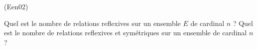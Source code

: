 \begin{tiny}(Een02)\end{tiny} 
Quel est le nombre de relations reflexives sur un ensemble $E$ de cardinal $n$ ? Quel est le nombre de relations reflexives et symétriques sur un ensemble de cardinal $n$?